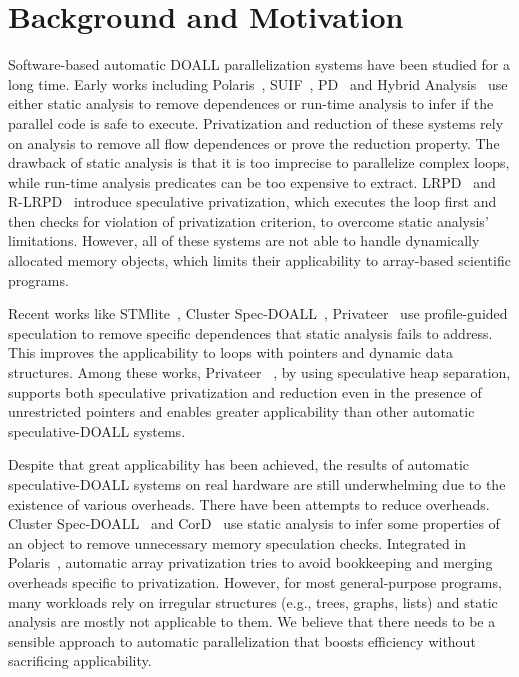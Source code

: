 \section{Background and Motivation}
\label{sec:motivation}


Software-based automatic DOALL parallelization systems have been studied
for a long time.
%
Early works including Polaris~\cite{blume:94:polaris},
SUIF~\cite{suif:94:stanford}, PD~\cite{rauchwerger:94:ics} and Hybrid
Analysis~\cite{rus:03:hybrid} use either static analysis to remove
dependences or run-time analysis to infer if the parallel code is safe to
execute. Privatization and reduction of these systems rely on
analysis to remove all flow dependences or prove the reduction property.
The drawback of static analysis is that it is too imprecise to parallelize
complex loops, while run-time analysis predicates can be too expensive to
extract. LRPD~\cite{dang:02:ipdps} and R-LRPD~\cite{dang:02:ipdps}
introduce speculative privatization, which executes the loop first and then
checks for violation of privatization criterion, to overcome static
analysis' limitations. However, all of these systems are not able to handle
dynamically allocated memory objects, which limits their applicability to
array-based scientific programs.

Recent works like STMlite~\cite{mehrara:09:stmlite}, Cluster
Spec-DOALL~\cite{kim:12:cgo}, Privateer~\cite{johnson:12:pldi} use
profile-guided speculation to remove specific dependences that static
analysis fails to address. This improves the applicability to loops with
pointers and dynamic data structures.  Among these works, Privateer
~\cite{johnson:12:pldi}, by using speculative heap separation, supports
both speculative privatization and reduction even in the presence of
unrestricted pointers and enables greater applicability than other
automatic speculative-DOALL systems.

Despite that great applicability has been achieved, the results of
automatic speculative-DOALL systems on real hardware are still
underwhelming due to the existence of various overheads. There have been
attempts to reduce overheads. Cluster Spec-DOALL~\cite{kim:12:cgo} and
CorD~\cite{ctian:2008:micro} use static analysis to infer some properties
of an object to remove unnecessary memory speculation checks. Integrated in
Polaris~\cite{blume:94:polaris}, automatic array
privatization\cite{tu:94:lcpc} tries to avoid bookkeeping and merging
overheads specific to privatization. However, for most general-purpose
programs, many workloads rely on irregular structures (e.g., trees, graphs,
lists) and static analysis are mostly not applicable to them. We believe
that there needs to be a sensible approach to automatic parallelization
that boosts efficiency without sacrificing applicability.


